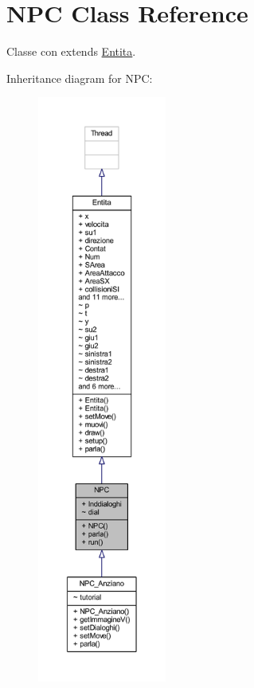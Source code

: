 \hypertarget{class_entita_1_1_n_p_c}{}\section{N\+PC Class Reference}
\label{class_entita_1_1_n_p_c}


Classe con extends \hyperlink{class_entita_1_1_entita}{Entita}.  




Inheritance diagram for N\+PC\+:
\nopagebreak
\begin{figure}[H]
\begin{center}
\leavevmode
\includegraphics[height=550pt]{class_entita_1_1_n_p_c__inherit__graph}
\end{center}
\end{figure}



